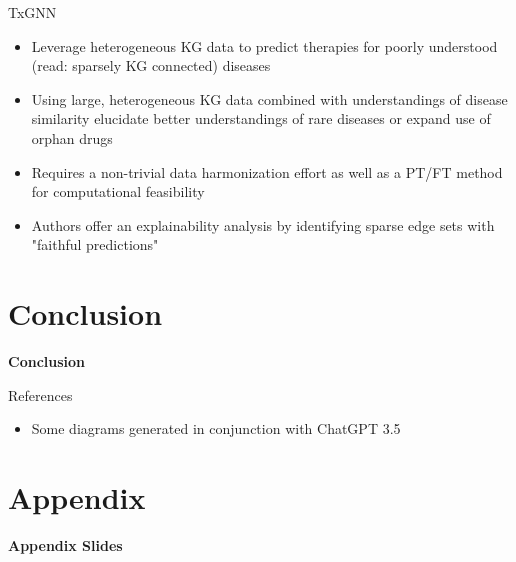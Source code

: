 \documentclass{beamer}
\begin{document}
\begin{frame}{TxGNN}
    \begin{itemize}
        \item Leverage heterogeneous KG data to predict therapies for poorly understood (read: sparsely KG connected) diseases 
        \item Using large, heterogeneous KG data combined with understandings of disease similarity elucidate better understandings of rare diseases or expand use of orphan drugs 
        \item Requires a non-trivial data harmonization effort as well as a PT/FT method for computational feasibility 
        \item Authors offer an explainability analysis by identifying sparse edge sets with "faithful predictions"
    \end{itemize}
\end{frame}


\section*{Conclusion}

\begin{frame}{}
    \bf{\LARGE Conclusion}    
\end{frame}



\begin{frame}[allowframebreaks]{References}
    \begin{itemize}
    \item Some diagrams generated in conjunction with ChatGPT 3.5
    \end{itemize}
    \printbibliography 
\end{frame}



\section*{Appendix}

\begin{frame}{}
\bf{\LARGE Appendix Slides}    
\end{frame}
\end{document}
